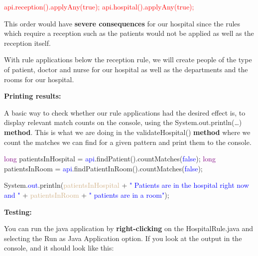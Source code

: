 {\textcolor{red}{api.reception().applyAny(true);}\newline
\textcolor{red}{api.hospital().applyAny(true);}\newline

This order would have \textbf{severe consequences} for our hospital since the rules which require a reception such as the patients would not be applied as well as the reception itself. \newline

With rule applications below the reception rule, we will create people of the type of patient, doctor and nurse for our hospital as well as the departments and the rooms for our hospital.\newline

\textbf{Printing results:}

A basic way to check whether our rule applications had the desired effect is, to display relevant match counts on the console, using the \textsf{System.out.println(…)} \textbf{method}. This is what we are doing in the \textsf{validateHospital()} \textbf{method} where we count the matches we can find for a given pattern and print them to the console.\newline

{

\textcolor{Purple}{long} patientsInHospital = \textcolor{blue}{api}.findPatient().countMatches(\textcolor{blue}{false});\newline
\textcolor{Purple}{long} patientsInRoom = \textcolor{blue}{api}.findPatientInRoom().countMatches(\textcolor{blue}{false});\newline

System.\textcolor{blue}{out}.println(\textcolor{Tan}{patientsInHospital} + \textcolor{blue}{" Patients are in the hospital right now and "} + \textcolor{Tan}{patientsInRoom} + \textcolor{blue}{" patients are in a room"});\newline\newline
	
}

\clearpage

\textbf{Testing:}

You can run the java application by \textbf{right-clicking} on the \textsf{HospitalRule.java} and selecting the \textsf{Run as Java Application} option. If you look at the output in the console, and it should look like this:\newline

{

}}
